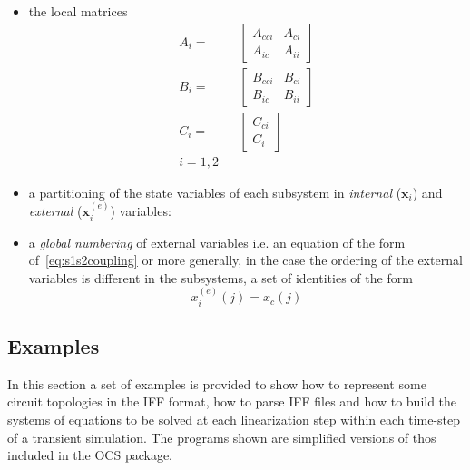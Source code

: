 \documentclass{scrartcl}
\let\tt=\normalfont\ttfamily
\let\it=\normalfont\itshape
\newcommand{\Iff}{{\tt IFF}}
\begin{document}
\begin{itemize}
\item the local matrices 
  \begin{eqnarray}
    \label{eq:locmati}
    A_{i} = & &
    \left[ \begin{array}{cc} A_{cci} & A_{ci} \nonumber \\   
        A_{ic} & A_{ii} \end{array}  \right]\\
    B_{i} = & &
    \left[ \begin{array}{cc} B_{cci} & B_{ci} \\   
        B_{ic} & B_{ii} \end{array} \right] \nonumber \\
    C_{i} = & &
    \left[ \begin{array}{c} C_{ci} \\   
        C_{i} \end{array} \right] \nonumber \\
    i=1,2 && \nonumber
  \end{eqnarray}
\item a partitioning of the state variables of each subsystem in 
  \emph{internal} ($\mathbf{x}_{i}$) and \emph{external}
  ($\mathbf{x}_{i}^{(e)}$) variables:
\item a \emph{global numbering} of external variables {\it i.e.} an 
  equation of the form of~\eqref{eq:s1s2coupling} or more generally,
  in the case the ordering of the external variables is different in
  the subsystems, a set of identities of the form 
  $$ x_{i}^{(e)} (j) = x_c (j)$$
\end{itemize}


\subsection{Examples}

In this section a set of examples is provided to show how to represent some
circuit topologies in the {\Iff} format, how to parse {\Iff} files and how
to build the systems of equations to be solved at each linearization step 
within each time-step of a transient simulation.
The programs shown are simplified versions of thos included in the OCS package.
\end{document}
